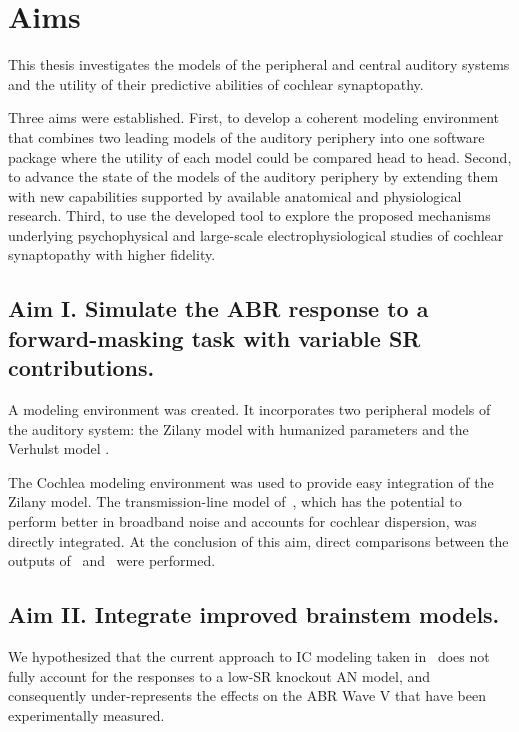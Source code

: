 \chapter{Aims}
\label{chapter:Aims}
\thispagestyle{myheadings}
This thesis investigates the models of the peripheral and central auditory systems and the utility of their predictive abilities of cochlear synaptopathy. 

Three aims were established.  First, to develop a coherent modeling environment that combines two leading models of the auditory periphery into one software package where the utility of each model could be compared head to head.  Second, to advance the state of the models of the auditory periphery by extending them with new capabilities supported by available anatomical and physiological research.  Third, to use the developed tool to explore the proposed mechanisms underlying psychophysical and large-scale electrophysiological studies of cochlear synaptopathy with higher fidelity.


\section{Aim I. Simulate the ABR response to a forward-masking task with variable SR contributions.}
A modeling environment was created.  It incorporates two peripheral models of the auditory system: the Zilany model with humanized parameters \citep{Zilany2014Updated} and the Verhulst model \citep{Verhulst2015Functional}.  

The Cochlea modeling environment \citep{Rudnicki2014Cochlea} was used to provide easy integration of the Zilany model. The transmission-line model of~\cite{Verhulst2015Functional}, which has the potential to perform better in broadband noise and accounts for cochlear dispersion, was directly integrated.
At the conclusion of this aim, direct comparisons between the outputs of~\cite{Zilany2014Updated} and~\cite{Verhulst2015Functional} were performed.

\section{Aim II. Integrate improved brainstem models.}  

We hypothesized that the current approach to IC modeling taken in~\cite{Verhulst2015Functional,Mehraei2016Auditory} does not fully account for the responses to a low-SR knockout AN model, and consequently under-represents the effects on the ABR Wave V that have been experimentally measured.  


